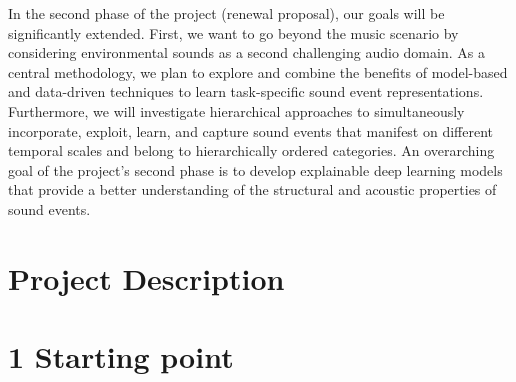 \documentclass[11pt,a4paper]{article}
\theoremstyle{plain} \newtheorem{define}{Definition}[section]
\begin{document}
%
In the second phase of the project (renewal proposal), our goals will be significantly extended. First, we want to go beyond the music scenario by considering environmental sounds as a second challenging audio domain. As a central methodology, we plan to explore and combine the benefits of model-based and data-driven techniques to learn task-specific sound event representations. Furthermore, we will investigate hierarchical approaches to simultaneously incorporate, exploit, learn, and capture sound events that manifest on different temporal scales and belong to hierarchically ordered categories. An overarching goal of the project's second phase is to develop explainable deep learning models that provide a better understanding of the structural and acoustic properties of sound events.
%
\pagebreak[4]\clearpage

\sloppy \pagestyle{plain} \setcounter{page}{1}

\section*{Project Description}

\section*{1 Starting point}
\end{document}
